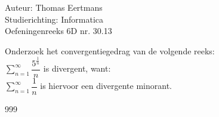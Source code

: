 \documentclass[a4paper]{article}
\begin{document}
  
\noindent \large Auteur: Thomas Eertmans \\
\noindent \large Studierichting: Informatica\\
\noindent \large Oefeningenreeks 6D nr. 30.13\\

\medskip

\normalsize

Onderzoek het convergentiegedrag van de volgende reeks: \\

$\displaystyle\sum\limits_{n=1}^\infty \dfrac{5^{\tfrac{1}{n}}}{n}$ is divergent, want:\\

$\displaystyle\sum\limits_{n=1}^\infty \dfrac{1}{n}$ is hiervoor een divergente minorant.

\begin{thebibliography}{999}
\end{thebibliography}
\end{document}
